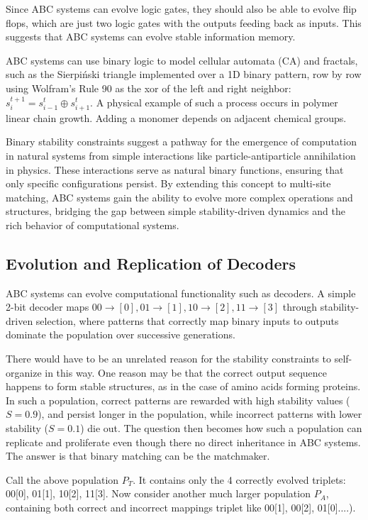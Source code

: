 \documentclass[entropy,article,submit,pdftex,moreauthors]{Definitions/mdpi}
\begin{document}
Since ABC systems can evolve logic gates, they should also be able to evolve flip flops, which are just two logic gates with the outputs feeding back as inputs. This suggests that ABC systems can evolve stable information memory.

ABC systems can use binary logic to model cellular automata (CA) and fractals, such as the Sierpiński triangle implemented over a 1D binary pattern, row by row using Wolfram's Rule 90 \cite{wolfram1983statistical} as the xor of the left and right neighbor: \( s_{i}^{t+1} = s_{i-1}^t \oplus s_{i+1}^t \). A physical example of such a process occurs in polymer linear chain growth. Adding a monomer depends on adjacent chemical groups.

Binary stability constraints suggest a pathway for the emergence of computation in natural systems from simple interactions like particle-antiparticle annihilation in physics. These interactions serve as natural binary functions, ensuring that only specific configurations persist. By extending this concept to multi-site matching, ABC systems gain the ability to evolve more complex operations and structures, bridging the gap between simple stability-driven dynamics and the rich behavior of computational systems.

\subsection{Evolution and Replication of Decoders}

ABC systems can evolve computational functionality such as decoders. A simple 2-bit decoder maps \(00 \to [0], 01 \to [1], 10 \to [2], 11 \to [3]\) through stability-driven selection, where patterns that correctly map binary inputs to outputs dominate the population over successive generations. 

There would have to be an unrelated reason for the stability constraints to self-organize in this way. One reason may be that the correct output sequence happens to form stable structures, as in the case of amino acids forming proteins. In such a population, correct patterns are rewarded with high stability values (\( S=0.9 \)), and persist longer in the population, while incorrect patterns with lower stability (\( S=0.1 \)) die out. The question then becomes how such a population can replicate and proliferate even though there no direct inheritance in ABC systems. The answer is that binary matching can be the matchmaker.

Call the above population \( P_T \). It contains only the 4 correctly evolved triplets: 
00[0], 01[1], 10[2], 11[3]. Now consider another much larger population \( P_A \), containing both correct and incorrect mappings triplet like  00[1], 00[2], 01[0]....).
\end{document}
